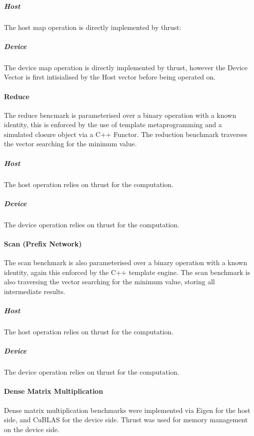 \subparagraph{Host}
The host map operation is directly implemented by thrust:


\subparagraph{Device}
The device map operation is directly implemented by thrust, however the Device Vector is first
intisialised by the Host vector before being operated on.



\paragraph{Reduce}
The reduce bencmark is parameterised over a binary operation with a known identity, this is enforced
by the use of template metaprogramming and a simulated closure object via a C++ Functor. The
reduction benchmark traverses the vector searching for the minimum value.

\subparagraph{Host}
The host operation relies on thrust for the computation.


\subparagraph{Device}
The device operation relies on thrust for the computation.



\paragraph{Scan (Prefix Network)}
The scan benchmark is also parameterised over a binary operation with a known identity, again this
enforced by the C++ template engine. The scan benchmark is also traversing the vector searching for
the minimum value, storing all intermediate results.

\subparagraph{Host}
The host operation relies on thrust for the computation.


\subparagraph{Device}
The device operation relies on thrust for the computation.


\paragraph{Dense Matrix Multiplication}
Dense matrix multiplication benchmarks were implemented via Eigen for the host side, and CuBLAS for
the device side. Thrust was used for memory management on the device side.

